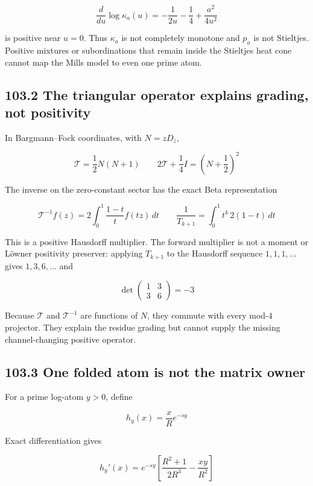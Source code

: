 \documentclass[
  11pt,
]{book}
\begin{document}
\[
\frac{d}{du}\log\kappa_a(u)
=-\frac1{2u}-\frac14+\frac{a^2}{4u^2}
\tag{103.5}
\]

is positive near \(u=0\). Thus \(\kappa_a\) is not completely monotone
and \(p_a\) is not Stieltjes. Positive mixtures or subordinations that
remain inside the Stieltjes heat cone cannot map the Mills model to even
one prime atom.

\subsection{103.2 The triangular operator explains grading, not
positivity}\label{the-triangular-operator-explains-grading-not-positivity}

In Bargmann--Fock coordinates, with \(N=zD_z\),

\[
\mathcal T=\frac12N(N+1)
\qquad
2\mathcal T+\frac14I
=\left(N+\frac12\right)^2
\tag{103.6}
\]

The inverse on the zero-constant sector has the exact Beta
representation

\[
\mathcal T^{-1}f(z)
=2\int_0^1\frac{1-t}{t}f(tz)\,dt
\qquad
\frac1{T_{k+1}}=\int_0^1t^k\,2(1-t)\,dt
\tag{103.7}
\]

This is a positive Hausdorff multiplier. The forward multiplier is not a
moment or Löwner positivity preserver: applying \(T_{k+1}\) to the
Hausdorff sequence \(1,1,1,\ldots\) gives \(1,3,6,\ldots\) and

\[
\det\begin{pmatrix}1&3\\3&6\end{pmatrix}=-3
\tag{103.8}
\]

Because \(\mathcal T\) and \(\mathcal T^{-1}\) are functions of \(N\),
they commute with every mod-\(4\) projector. They explain the residue
grading but cannot supply the missing channel-changing positive
operator.

\subsection{103.3 One folded atom is not the matrix
owner}\label{one-folded-atom-is-not-the-matrix-owner}

For a prime log-atom \(y>0\), define

\[
h_y(x)=\frac{x}{R}e^{-sy}
\]

Exact differentiation gives

\[
h_y'(x)
=e^{-sy}\left[
\frac{R^2+1}{2R^3}
-\frac{xy}{R^2}
\right]
\tag{103.9}
\]
\end{document}
